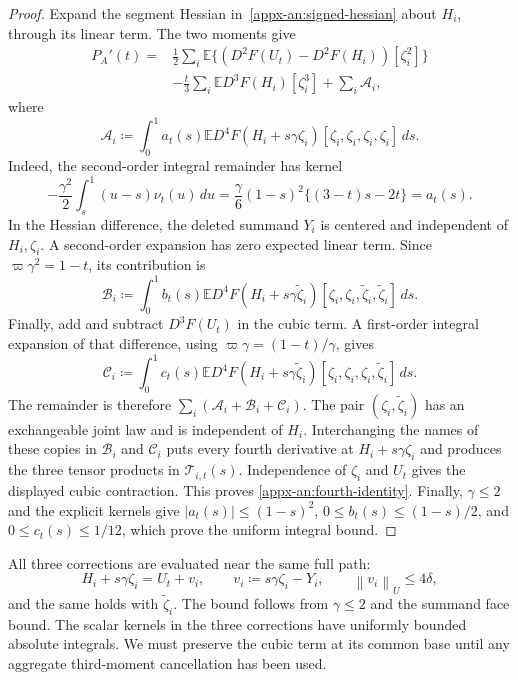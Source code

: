 \documentclass[11pt,letterpaper]{article}
\theoremstyle{remark}
\newcommand{\E}{\mathbb E}
\newcommand{\norm}[1]{\left\lVert#1\right\rVert}
\newcommand{\dd}{\,d}
\begin{document}
\begin{proof}
Expand the segment Hessian in~\eqref{appx-an:signed-hessian}
about \(H_i\), through its linear term. The two moments give
\begin{align*}
 P_A'(t)
 ={}&\frac12\sum_i\E\{(D^2F(U_t)-D^2F(H_i))[\zeta_i^2]\}\\
 &-\frac t3\sum_i\E D^3F(H_i)[\zeta_i^3]
       +\sum_i\mathcal A_i,
\end{align*}
where
\begin{equation}
 \mathcal A_i\coloneqq\int_0^1 a_t(s)
 \E D^4F(H_i+s\gamma\zeta_i)
       [\zeta_i,\zeta_i,\zeta_i,\zeta_i]\dd s.
 \label{appx-an:A}
\end{equation}
Indeed, the second-order integral remainder has kernel
\[
 -\frac{\gamma^2}{2}\int_s^1(u-s)\nu_t(u)\dd u
 =\frac\gamma6(1-s)^2\{(3-t)s-2t\}=a_t(s).
\]
In the Hessian difference, the deleted summand \(Y_i\) is centered
and independent of \(H_i,\zeta_i\). A second-order expansion has
zero expected linear term. Since \(\varpi\gamma^2=1-t\), its
contribution is
\begin{equation}
 \mathcal B_i\coloneqq\int_0^1 b_t(s)
 \E D^4F(H_i+s\gamma\widetilde\zeta_i)
       [\zeta_i,\zeta_i,\widetilde\zeta_i,\widetilde\zeta_i]\dd s.
 \label{appx-an:B}
\end{equation}
Finally, add and subtract \(D^3F(U_t)\) in the cubic term.
A first-order integral expansion of that difference, using
\(\varpi\gamma=(1-t)/\gamma\), gives
\begin{equation}
 \mathcal C_i\coloneqq\int_0^1 c_t(s)
 \E D^4F(H_i+s\gamma\widetilde\zeta_i)
       [\zeta_i,\zeta_i,\zeta_i,\widetilde\zeta_i]\dd s.
 \label{appx-an:C}
\end{equation}
The remainder is therefore \(\sum_i(\mathcal A_i+\mathcal B_i+\mathcal C_i)\).
The pair \((\zeta_i,\widetilde\zeta_i)\) has an exchangeable joint
law and is independent of \(H_i\). Interchanging the names of these
copies in \(\mathcal B_i\) and \(\mathcal C_i\) puts every fourth
derivative at \(H_i+s\gamma\zeta_i\) and produces the three tensor
products in \(\mathcal T_{i,t}(s)\). Independence of \(\zeta_i\)
and \(U_t\) gives the displayed cubic contraction. This proves
\eqref{appx-an:fourth-identity}. Finally, \(\gamma\le2\) and the
explicit kernels give
\( |a_t(s)|\le(1-s)^2\),
\(0\le b_t(s)\le(1-s)/2\), and
\(0\le c_t(s)\le1/12\), which prove the uniform integral bound.
\end{proof}

All three corrections are evaluated near the same full path:
\begin{equation}
 H_i+s\gamma\zeta_i=U_t+v_i,\qquad
 v_i\coloneqq s\gamma\zeta_i-Y_i,\qquad \norm{v_i}_U\le4\delta,
 \label{appx-an:translates}
\end{equation}
and the same holds with \(\widetilde\zeta_i\). The bound follows
from \(\gamma\le2\) and the summand face bound. The scalar kernels
in the three corrections have uniformly bounded absolute integrals.
We must preserve the cubic term at its common base until any
aggregate third-moment cancellation has been used.
\end{document}

